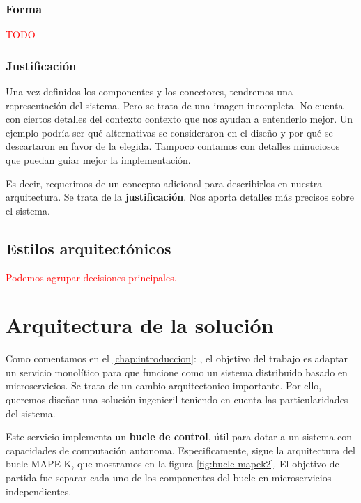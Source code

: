 \subsubsection{Forma}

\textcolor{red}{TODO}

\subsubsection{Justificación}

Una vez definidos los componentes y los conectores, tendremos una representación del sistema. Pero se trata de una imagen incompleta. No cuenta con ciertos detalles del contexto contexto que nos ayudan a entenderlo mejor. Un ejemplo podría ser qué alternativas se consideraron en el diseño y por qué se descartaron en favor de la elegida. Tampoco contamos con detalles minuciosos que puedan guiar mejor la implementación.

Es decir, requerimos de un concepto adicional para describirlos en nuestra arquitectura. Se trata de la \textbf{justificación}. \cite{perryFoundationsStudySoftware1992} Nos aporta detalles más precisos sobre el sistema.

\subsection{Estilos arquitectónicos}

\textcolor{red}{Podemos agrupar decisiones principales.}

\section{Arquitectura de la solución}

Como comentamos en el \autoref{chap:introduccion}: , el objetivo del trabajo es adaptar un servicio monolítico para que funcione como un sistema distribuido basado en microservicios. Se trata de un cambio arquitectonico importante. Por ello, queremos diseñar una solución ingenieril teniendo en cuenta las particularidades del sistema.

Este servicio implementa un \textbf{bucle de control}, útil para dotar a un sistema con capacidades de computación autonoma. Especificamente, sigue la arquitectura del bucle MAPE-K\cite{ArchitecturalBlueprintAutonomic2006,fonsServiciosAdaptivereadyPara2021}, que mostramos en la figura \ref{fig:bucle-mapek2}. El objetivo de partida fue separar cada uno de los componentes del bucle en microservicios independientes.

